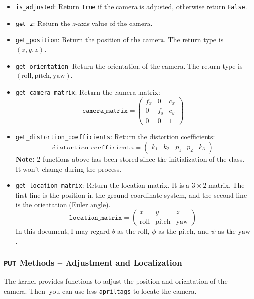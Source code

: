 \documentclass{article}
\begin{document}
\begin{itemize}
  \item \texttt{is\_adjusted}: Return \texttt{True} if the camera is adjusted, otherwise return \texttt{False}.
  \item \texttt{get\_z}: Return the $z$-axis value of the camera.
  \item \texttt{get\_position}: Return the position of the camera. The return type is $\left(x,y,z\right)$.
  \item \texttt{get\_orientation}: Return the orientation of the camera. The return type is $\left(\mathrm{roll},\mathrm{pitch},\mathrm{yaw}\right)$.
  \item \texttt{get\_camera\_matrix}: Return the camera matrix:
  \[
    \texttt{camera\_matrix}=\left(\begin{matrix}
      f_x & 0 & c_x \\
      0 & f_y & c_y \\
      0 & 0 & 1
    \end{matrix}\right)
  \]
  \item \texttt{get\_distortion\_coefficients}: Return the distortion coefficients:
  \[
    \texttt{distortion\_coefficients}=\left(\begin{matrix}
      k_1 & k_2 & p_1 & p_2 & k_3
    \end{matrix}\right)
  \]
  \textbf{Note: } 2 functions above has been stored since the initialization of the class. It won't change during the process.
  \item \texttt{get\_location\_matrix}: Return the location matrix. It is a $3\times2$ matrix. The first line is the position in the ground coordinate system, and the second line is the orientation (Euler angle).
  \[
    \texttt{location\_matrix}=\left(\begin{matrix}
      x & y & z \\
      \mathrm{roll} & \mathrm{pitch} & \mathrm{yaw}
    \end{matrix}\right)
  \]
  In this document, I may regard $\theta$ as the $\mathrm{roll}$, $\phi$ as the $\mathrm{pitch}$, and $\psi$ as the $\mathrm{yaw}$.
\end{itemize}

\subsubsection{\texttt{PUT} Methods -- Adjustment and Localization}

The kernel provides functions to adjust the position and orientation of the camera. Then, you can use less \texttt{apriltags} to locate the camera.
\end{document}
